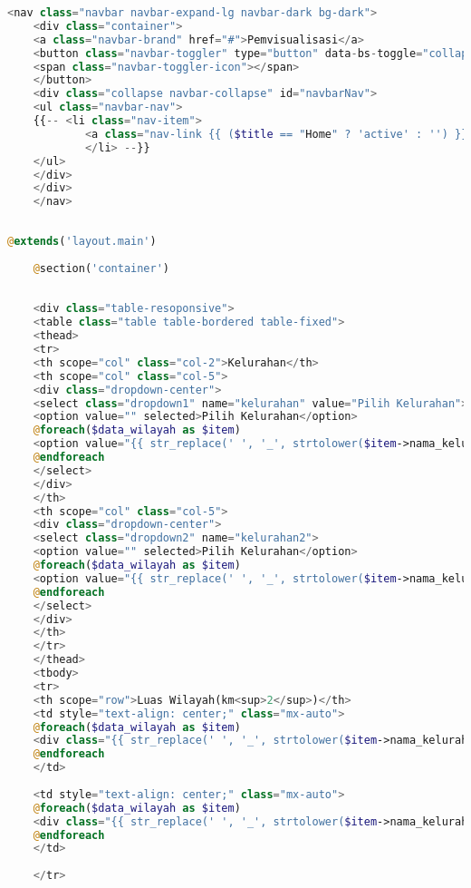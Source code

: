 \begin{lstlisting}[language=PHP, caption=navbar.blade.php]
	<nav class="navbar navbar-expand-lg navbar-dark bg-dark">
	<div class="container">
	<a class="navbar-brand" href="#">Pemvisualisasi</a>
	<button class="navbar-toggler" type="button" data-bs-toggle="collapse" data-bs-target="#navbarNav" aria-controls="navbarNav" aria-expanded="false" aria-label="Toggle navigation">
	<span class="navbar-toggler-icon"></span>
	</button>
	<div class="collapse navbar-collapse" id="navbarNav">
	<ul class="navbar-nav">
	{{-- <li class="nav-item">
			<a class="nav-link {{ ($title == "Home" ? 'active' : '') }}" href="/">Home</a>
			</li> --}}
	</ul>
	</div>
	</div>
	</nav>
	
\end{lstlisting}

\begin{lstlisting}[language=PHP, caption=homePage.php]
	@extends('layout.main')
	
	@section('container')
	
	
	<div class="table-resoponsive">
	<table class="table table-bordered table-fixed">
	<thead>
	<tr>
	<th scope="col" class="col-2">Kelurahan</th>
	<th scope="col" class="col-5">
	<div class="dropdown-center">
	<select class="dropdown1" name="kelurahan" value="Pilih Kelurahan">
	<option value="" selected>Pilih Kelurahan</option>
	@foreach($data_wilayah as $item)
	<option value="{{ str_replace(' ', '_', strtolower($item->nama_kelurahan)) }}">{{ $item->nama_kelurahan }}</option>
	@endforeach
	</select>
	</div>
	</th>
	<th scope="col" class="col-5"> 
	<div class="dropdown-center">
	<select class="dropdown2" name="kelurahan2">
	<option value="" selected>Pilih Kelurahan</option>
	@foreach($data_wilayah as $item)
	<option value="{{ str_replace(' ', '_', strtolower($item->nama_kelurahan)) }}2">{{ $item->nama_kelurahan }}</option>
	@endforeach
	</select>
	</div>
	</th>
	</tr>
	</thead>
	<tbody>
	<tr>
	<th scope="row">Luas Wilayah(km<sup>2</sup>)</th>
	<td style="text-align: center;" class="mx-auto">
	@foreach($data_wilayah as $item)
	<div class="{{ str_replace(' ', '_', strtolower($item->nama_kelurahan)) }} box">{{ $item->luas_kelurahan }}</div>
	@endforeach
	</td>
	
	<td style="text-align: center;" class="mx-auto">
	@foreach($data_wilayah as $item)
	<div class="{{ str_replace(' ', '_', strtolower($item->nama_kelurahan)) }}2 box2">{{ $item->luas_kelurahan }}</div>
	@endforeach
	</td>
	
	</tr>
	

\end{lstlisting}
